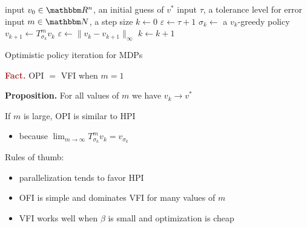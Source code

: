 \documentclass[xcolor=dvipsnames]{beamer}
\newcommand{\Fact}{\textcolor{Brown}{\bf Fact. }}
\newcommand{\RR}{\mathbbm R}
\newcommand{\NN}{\mathbbm N}
\renewcommand{\epsilon}{\varepsilon}
\newcommand{\1}{\mathbbm 1}
\begin{document}
\begin{frame}
    
    {\small
    \begin{algorithm}[H]
        \DontPrintSemicolon
        input $v_0 \in \RR^n$, an initial guess of $v^*$ \;
        input $\tau$, a tolerance level for error \;
        input $m \in \NN$, a step size \;
        $k \leftarrow 0$ \;
        $\epsilon \leftarrow \tau + 1$ \;
        \While{$\epsilon > \tau $}
        {
            $\sigma_k \leftarrow $ a $v_k$-greedy policy \;
            $v_{k+1} \leftarrow T_{\sigma_k}^m v_k$  \;
            $\epsilon \leftarrow \| v_k - v_{k+1} \|_\infty$ \;
            $k \leftarrow k + 1$ \;
        }
        \caption{Optimistic policy iteration for MDPs}
    \end{algorithm}
    }

\end{frame}


\begin{frame}


    \Fact OPI $=$ VFI  when $m=1$

    \vspace{0.5em}
    \vspace{0.5em}
    \begin{block}{}
        {\bf Proposition.} For all values of $m$ we have $v_k \to v^*$
    \end{block}


\end{frame}

\begin{frame}

    If $m$ is large, OPI is similar to HPI 


    \vspace{0.5em}
    \begin{itemize}
        \item because $\lim_{m \to \infty} T^m_{\sigma_k} v_k = v_{\sigma_k}$
    \end{itemize}


    Rules of thumb:

    \begin{itemize}
        \item parallelization tends to favor HPI
        \vspace{0.5em}
        \item OFI is simple and dominates VFI for many values of $m$
        \vspace{0.5em}
        \item VFI works well when $\beta$ is small and optimization is cheap
    \end{itemize}


\end{frame}
\end{document}
